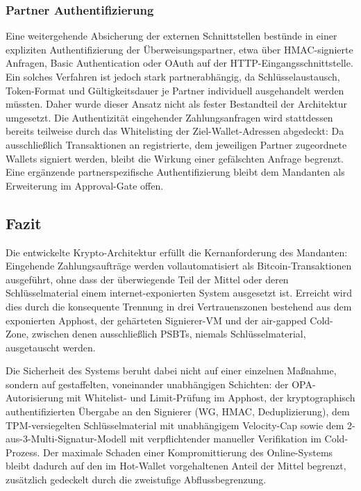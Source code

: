 \subsubsection{Partner Authentifizierung} \label{sec:partner_auth}
Eine weitergehende Absicherung der externen Schnittstellen bestünde in einer expliziten Authentifizierung der Überweisungspartner, etwa über \ac{HMAC}-signierte Anfragen, Basic Authentication oder OAuth auf der \ac{HTTP}-Eingangsschnittstelle. Ein solches Verfahren ist jedoch stark partnerabhängig, da Schlüsselaustausch, Token-Format und Gültigkeitsdauer je Partner individuell ausgehandelt werden müssten. Daher wurde dieser Ansatz nicht als fester Bestandteil der Architektur umgesetzt. 
Die Authentizität eingehender Zahlungsanfragen wird stattdessen bereits teilweise durch das Whitelisting der Ziel-Wallet-Adressen abgedeckt: Da ausschließlich Transaktionen an registrierte, dem jeweiligen Partner zugeordnete Wallets signiert werden, bleibt die Wirkung einer gefälschten Anfrage begrenzt. Eine ergänzende partnerspezifische Authentifizierung bleibt dem Mandanten als Erweiterung im Approval-Gate offen.


\subsection{Fazit}

Die entwickelte Krypto-Architektur erfüllt die Kernanforderung des Mandanten:
Eingehende Zahlungsaufträge werden vollautomatisiert als Bitcoin-Transaktionen ausgeführt, ohne dass der überwiegende Teil der Mittel oder deren Schlüsselmaterial einem internet-exponierten System ausgesetzt ist. Erreicht wird dies durch die konsequente Trennung in drei Vertrauenszonen bestehend aus dem exponierten Apphost, der gehärteten Signierer-\ac{VM} und der air-gapped Cold-Zone, zwischen denen ausschließlich \acp{PSBT}, niemals Schlüsselmaterial, ausgetauscht werden.

Die Sicherheit des Systems beruht dabei nicht auf einer einzelnen Maßnahme, sondern auf gestaffelten, voneinander unabhängigen Schichten: der \ac{OPA}-Autorisierung mit Whitelist- und Limit-Prüfung im Apphost, der kryptographisch authentifizierten Übergabe an den Signierer (\ac{WG}, \ac{HMAC}, Deduplizierung), dem \ac{TPM}-versiegelten Schlüsselmaterial mit unabhängigem Velocity-Cap sowie dem 2-aus-3-Multi-Signatur-Modell mit verpflichtender manueller Verifikation im Cold-Prozess. 
Der maximale Schaden einer Kompromittierung des Online-Systems bleibt dadurch auf den im Hot-Wallet vorgehaltenen Anteil der Mittel begrenzt, zusätzlich gedeckelt durch die zweistufige Abflussbegrenzung.

